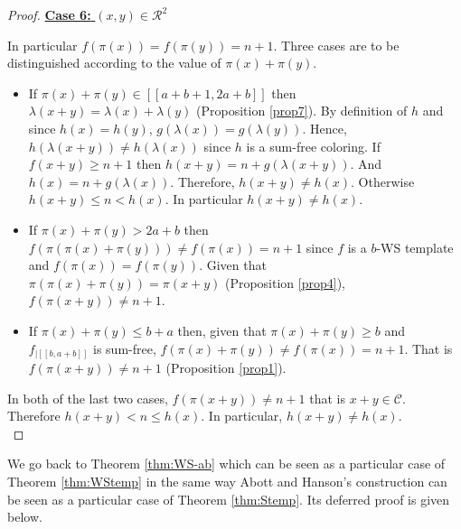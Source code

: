 \documentclass[final,onefignum,onetabnum]{siamart190516}
\begin{document}
\begin{proof}
\noindent \underline{\textbf{Case 6:} \((x,y) \in \mathcal{R}^2\)}
\par
In particular \(f(\pi(x)) = f(\pi(y))=n + 1\). Three cases are to be distinguished according to the value of \(\pi(x) + \pi(y)\).
\begin{itemize}
\item If \(\pi(x) + \pi(y) \in [\![a + b + 1, 2 a + b]\!]\) then \(\lambda(x + y) = \lambda(x) + \lambda(y)\)
	(Proposition \ref{prop7}). By definition of \(h\) and since \(h(x) = h(y)\), \(g(\lambda(x)) = g(\lambda(y))\).
	Hence, \(h(\lambda(x + y)) \neq h(\lambda(x))\) since \(h\) is a sum-free coloring. If \(f(x+y) \geqslant n + 1\)
	then \(h(x + y) = n + g(\lambda(x + y))\). And \(h(x) = n + g(\lambda(x))\). Therefore, \(h(x + y)  \neq h(x)\).
	Otherwise \(h(x+y) \leqslant n < h(x)\). In particular \(h(x + y) \neq h(x)\).
\item If \(\pi(x)+\pi(y)>2a+b\) then \(f(\pi(\pi(x)+\pi(y))) \neq f(\pi(x)) = n + 1\) since \(f\) is a \(b\)-WS template and
	\(f(\pi(x)) = f(\pi(y))\). Given that \(\pi(\pi(x)+\pi(y)) = \pi(x+y)\) (Proposition \ref{prop4}), \(f(\pi(x+y)) \neq n + 1\).
\item \begin{sloppypar}
	If \(\pi(x)+\pi(y)\leqslant b+a\) then, given that \(\pi(x)+\pi(y) \geqslant b\) and \(f_{| [\![b, a + b ]\!]}\) is
	sum-free, \({f(\pi(x) + \pi(y)) \neq f(\pi(x)) = n + 1}\). That is \({f(\pi(x + y)) \neq n + 1}\) (Proposition \ref{prop1}).
	\end{sloppypar}
\end{itemize}
\par
In both of the last two cases, \({f(\pi(x + y)) \neq n + 1}\) that is \(x+y \in \mathcal{C}\). Therefore \(h(x+y) < n \leqslant h(x)\).
In particular, \(h(x + y) \neq h(x)\). \\
\end{proof}

We go back to Theorem \ref{thm:WS-ab} which can be seen as a particular case of Theorem \ref{thm:WStemp} in the same way Abott and Hanson's 
construction \cite{AbbottHanson} can be seen as a particular case of Theorem \ref{thm:Stemp}. Its deferred proof is given below.
\end{document}
